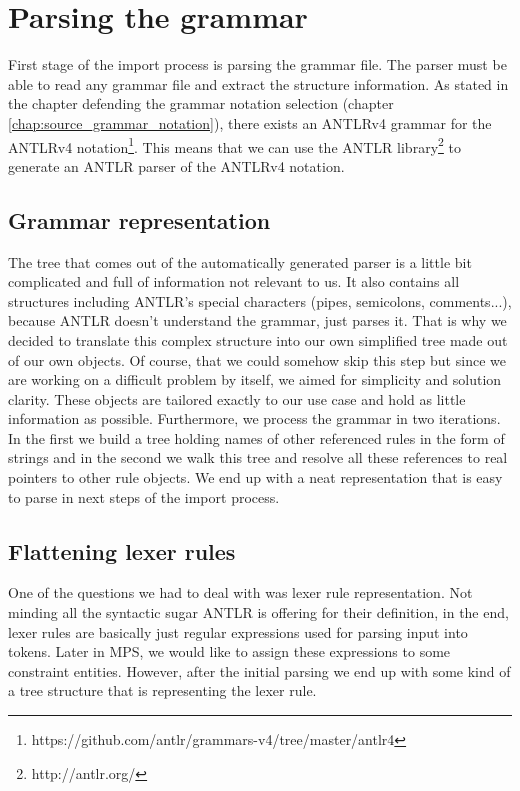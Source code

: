 \section{Parsing the grammar}

First stage of the import process is parsing the grammar file. The parser must be able to read any grammar file and extract the structure information. As stated in the chapter defending the grammar notation selection (chapter  \ref{chap:source_grammar_notation}), there exists an ANTLRv4 grammar for the ANTLRv4 notation\footnote{https://github.com/antlr/grammars-v4/tree/master/antlr4}. This means that we can use the ANTLR library\footnote{http://antlr.org/} to generate an ANTLR parser of the ANTLRv4 notation. 

\subsection{Grammar representation}

The tree that comes out of the automatically generated parser is a little bit complicated and full of information not relevant to us. It also contains all structures including ANTLR's special characters (pipes, semicolons, comments...), because ANTLR doesn't understand the grammar, just parses it. That is why we decided to translate this complex structure into our own simplified tree made out of our own objects. Of course, that we could somehow skip this step but since we are working on a difficult problem by itself, we aimed for simplicity and solution clarity. These objects are tailored exactly to our use case and hold as little information as possible. Furthermore, we process the grammar in two iterations. In the first we build a tree holding names of other referenced rules in the form of strings and in the second we walk this tree and resolve all these references to real pointers to other rule objects. We end up with a neat representation that is easy to parse in next steps of the import process.

\subsection{Flattening lexer rules}
One of the questions we had to deal with was lexer rule representation. Not minding all the syntactic sugar ANTLR is offering for their definition, in the end, lexer rules are basically just regular expressions used for parsing input into tokens. Later in MPS, we would like to assign these expressions to some constraint entities. However, after the initial parsing we end up with some kind of a tree structure that is representing the lexer rule. 

